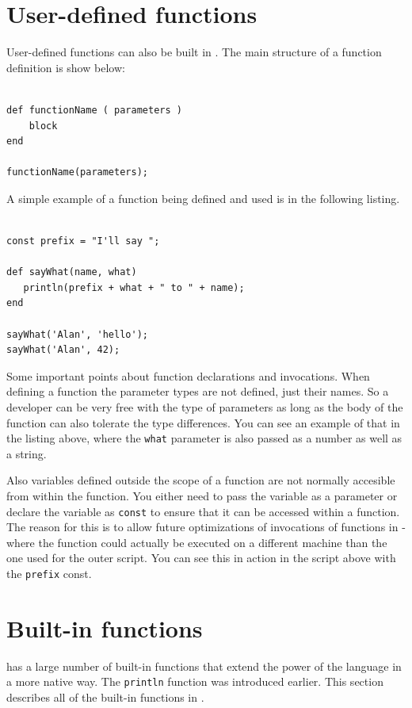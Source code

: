 \chapter{User-defined functions}
User-defined functions  can also be built in \Reflex. The main structure of a function definition is show below:
\begin{verbatim}

def functionName ( parameters )
    block
end

functionName(parameters);

\end{verbatim}
A simple example of a function being defined and used is in the following listing.

\begin{lstlisting}[caption={Function definition}]

const prefix = "I'll say ";

def sayWhat(name, what) 
   println(prefix + what + " to " + name);
end

sayWhat('Alan', 'hello');
sayWhat('Alan', 42);

\end{lstlisting}

Some important points about function declarations and invocations. When defining a function the parameter types are not defined, just their names. So a developer can be very free with the type of parameters as long as the body of the function can also tolerate the type differences. You can see an example of that in the listing above, where the \verb+what+ parameter is also passed as a number as well as a string.

Also variables defined outside the scope of a function are not normally accesible from within the function. You either need to pass the variable as a parameter or declare the variable as \verb+const+ to ensure that it can be accessed within a function. The reason for this is to allow future optimizations of invocations of functions in \Reflex - where the function could actually be executed on a different machine than the one used for the outer script. You can see this in action in the script above with the \verb+prefix+ const.

\chapter{Built-in functions}
\Reflex has a large number of built-in functions that extend the power of the language in a more native way. The \verb+println+ function was introduced earlier. This section describes all of the built-in functions in \Reflex.

